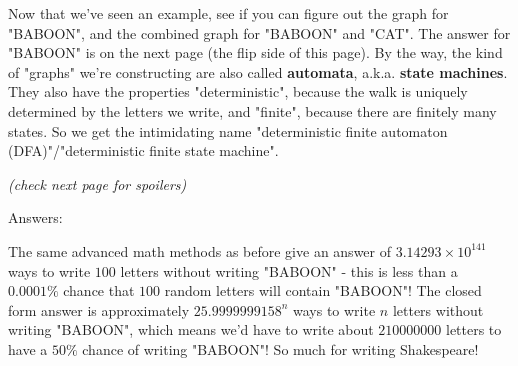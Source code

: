 \documentclass[12pt]{article}
\begin{document}
\newpage

Now that we've seen an example, see if you can figure out the graph for "BABOON", and the combined graph for "BABOON" and "CAT". The answer for "BABOON" is on the next page (the flip side of this page). By the way, the kind of "graphs" we're constructing are also called \textbf{automata}, a.k.a. \textbf{state machines}. They also have the properties "deterministic", because the walk is uniquely determined by the letters we write, and "finite", because there are finitely many states. So we get the intimidating name "deterministic finite automaton (DFA)"/"deterministic finite state machine".

\textit{(check next page for spoilers)}

\newpage

Answers:

The same advanced math methods as before give an answer of $3.14293\times 10^{141}$ ways to write $100$ letters without writing "BABOON" - this is less than a $0.0001\%$ chance that $100$ random letters will contain "BABOON"! The closed form answer is approximately $25.9999999158^n$ ways to write $n$ letters without writing "BABOON", which means we'd have to write about $210000000$ letters to have a $50\%$ chance of writing "BABOON"! So much for writing Shakespeare!
\end{document}
